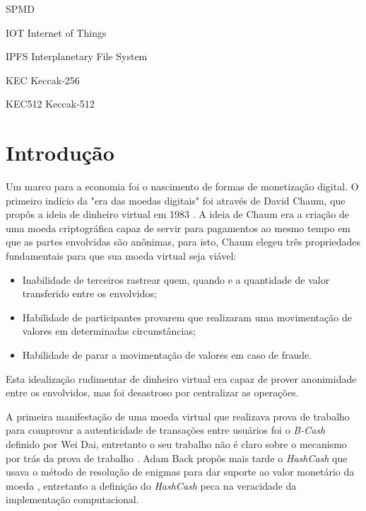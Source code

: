 \documentclass[tcc,capa]{texufpel}
\begin{document}
\listoffigures

\listoftables

\begin{listofabbrv}{SPMD}
        \item[IOT] Internet of Things
        \item[IPFS] Interplanetary File System
        \item[KEC] Keccak-256
        \item[KEC512] Keccak-512
\end{listofabbrv}

\tableofcontents

\chapter{Introdução}

    Um marco para a economia foi o nascimento de formas de monetização digital. O primeiro indício da "era das moedas digitais" foi através de David Chaum, que propôs a ideia de dinheiro virtual em 1983 \cite{chaum1983blind}. A ideia de Chaum era a criação de uma moeda criptográfica capaz de servir para pagamentos ao mesmo tempo em que as partes envolvidas são anônimas, para isto, Chaum elegeu três propriedades fundamentais para que sua moeda virtual seja viável: 
	
	\begin{itemize}
	    \item Inabilidade de terceiros rastrear quem, quando e a quantidade de valor transferido entre os envolvidos;
	    \item Habilidade de participantes provarem que realizaram uma movimentação de valores em determinadas circunstâncias;
	    \item Habilidade de parar a movimentação de valores em caso de fraude.
	\end{itemize}
	
	Esta idealização rudimentar de dinheiro virtual era capaz de prover anonimidade entre os envolvidos, mas foi desastroso por centralizar as operações.
	
	A primeira manifestação de uma moeda virtual que realizava prova de trabalho para comprovar a autenticidade de transações entre usuários foi o \textit{B-Cash} definido por Wei Dai, entretanto o seu trabalho não é claro sobre o mecanismo por trás da prova de trabalho \cite{buterin2014next}. Adam Back propôs mais tarde o \textit{HashCash} que usava o método de resolução de enigmas para dar suporte ao valor monetário da moeda \cite{back2002hashcash}, entretanto a definição do \textit{HashCash} peca na veracidade da implementação computacional.
	
\end{document}
